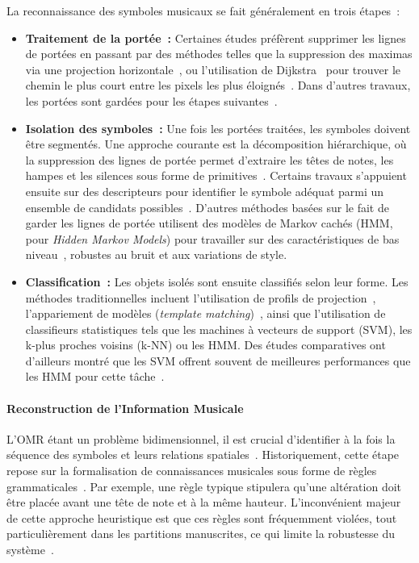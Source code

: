 \documentclass[a4paper,10pt]{article}
\begin{document}
La reconnaissance des symboles musicaux se fait généralement en trois étapes~:
\begin{itemize}
    \item \textbf{Traitement de la portée~:} Certaines études préfèrent supprimer les lignes de portées en passant par des méthodes telles que la suppression des maximas via une projection horizontale~\cite{Blostein1992}, ou l'utilisation de Dijkstra~\cite{dijkstra1959} pour trouver le chemin le plus court entre les pixels les plus éloignés~\cite{4402863}. Dans d'autres travaux, les portées sont gardées pour les étapes suivantes~\cite{ng1999embracing, pugin2006}.
    
    \item \textbf{Isolation des symboles~:} Une fois les portées traitées, les symboles doivent être segmentés. Une approche courante est la décomposition hiérarchique, où la suppression des lignes de portée permet d'extraire les têtes de notes, les hampes et les silences sous forme de primitives~\cite{NG199639, gocke2003building}. Certains travaux s'appuient ensuite sur des descripteurs pour identifier le symbole adéquat parmi un ensemble de candidats possibles~\cite{mahoney1982}. D'autres méthodes basées sur le fait de garder les lignes de portée utilisent des modèles de Markov cachés (HMM, pour \textit{Hidden Markov Models}) pour travailler sur des caractéristiques de bas niveau~\cite{pugin2006, 7814083}, robustes au bruit et aux variations de style.
    
    \item \textbf{Classification~:} Les objets isolés sont ensuite classifiés selon leur forme. Les méthodes traditionnelles incluent l'utilisation de profils de projection~\cite{fujinaga1988}, l'appariement de modèles (\textit{template matching})~\cite{gocke2003building}, ainsi que l'utilisation de classifieurs statistiques tels que les machines à vecteurs de support (SVM), les k-plus proches voisins (k-NN) ou les HMM. Des études comparatives ont d'ailleurs montré que les SVM offrent souvent de meilleures performances que les HMM pour cette tâche~\cite{rebelo2010}.
\end{itemize}

\paragraph{Reconstruction de l'Information Musicale}

L'OMR étant un problème bidimensionnel, il est crucial d'identifier à la fois la séquence des symboles et leurs relations spatiales~\cite{shatri2020opticalmusicrecognitionstate}. Historiquement, cette étape repose sur la formalisation de connaissances musicales sous forme de règles grammaticales~\cite{bainbridge2003, couasnon1995}. Par exemple, une règle typique stipulera qu'une altération doit être placée avant une tête de note et à la même hauteur. L'inconvénient majeur de cette approche heuristique est que ces règles sont fréquemment violées, tout particulièrement dans les partitions manuscrites, ce qui limite la robustesse du système~\cite{shatri2020opticalmusicrecognitionstate}.
\end{document}
